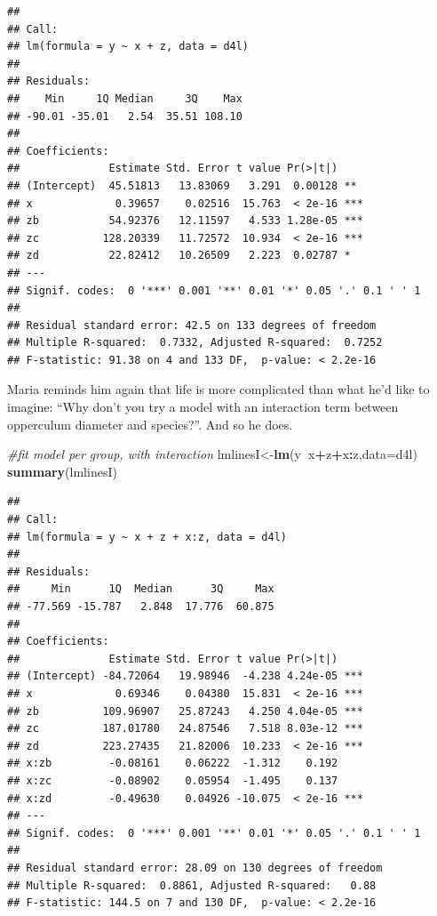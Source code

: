 \documentclass[
]{book}
\newenvironment{Shaded}{\begin{snugshade}}{\end{snugshade}}
\newcommand{\CommentTok}[1]{\textcolor[rgb]{0.56,0.35,0.01}{\textit{#1}}}
\newcommand{\DataTypeTok}[1]{\textcolor[rgb]{0.13,0.29,0.53}{#1}}
\newcommand{\KeywordTok}[1]{\textcolor[rgb]{0.13,0.29,0.53}{\textbf{#1}}}
\newcommand{\NormalTok}[1]{#1}
\newcommand{\OperatorTok}[1]{\textcolor[rgb]{0.81,0.36,0.00}{\textbf{#1}}}
\begin{document}
\begin{verbatim}
## 
## Call:
## lm(formula = y ~ x + z, data = d4l)
## 
## Residuals:
##    Min     1Q Median     3Q    Max 
## -90.01 -35.01   2.54  35.51 108.10 
## 
## Coefficients:
##              Estimate Std. Error t value Pr(>|t|)    
## (Intercept)  45.51813   13.83069   3.291  0.00128 ** 
## x             0.39657    0.02516  15.763  < 2e-16 ***
## zb           54.92376   12.11597   4.533 1.28e-05 ***
## zc          128.20339   11.72572  10.934  < 2e-16 ***
## zd           22.82412   10.26509   2.223  0.02787 *  
## ---
## Signif. codes:  0 '***' 0.001 '**' 0.01 '*' 0.05 '.' 0.1 ' ' 1
## 
## Residual standard error: 42.5 on 133 degrees of freedom
## Multiple R-squared:  0.7332,	Adjusted R-squared:  0.7252 
## F-statistic: 91.38 on 4 and 133 DF,  p-value: < 2.2e-16
\end{verbatim}

Maria reminds him again that life is more complicated than what he'd like to imagine: ``Why don't you try a model with an interaction term between opperculum diameter and species?''. And so he does.

\begin{Shaded}
\begin{Highlighting}[]
\CommentTok{#fit model per group, with interaction}
\NormalTok{lmlinesI<-}\KeywordTok{lm}\NormalTok{(y}\OperatorTok{~}\NormalTok{x}\OperatorTok{+}\NormalTok{z}\OperatorTok{+}\NormalTok{x}\OperatorTok{:}\NormalTok{z,}\DataTypeTok{data=}\NormalTok{d4l)}
\KeywordTok{summary}\NormalTok{(lmlinesI)}
\end{Highlighting}
\end{Shaded}

\begin{verbatim}
## 
## Call:
## lm(formula = y ~ x + z + x:z, data = d4l)
## 
## Residuals:
##     Min      1Q  Median      3Q     Max 
## -77.569 -15.787   2.848  17.776  60.875 
## 
## Coefficients:
##              Estimate Std. Error t value Pr(>|t|)    
## (Intercept) -84.72064   19.98946  -4.238 4.24e-05 ***
## x             0.69346    0.04380  15.831  < 2e-16 ***
## zb          109.96907   25.87243   4.250 4.04e-05 ***
## zc          187.01780   24.87546   7.518 8.03e-12 ***
## zd          223.27435   21.82006  10.233  < 2e-16 ***
## x:zb         -0.08161    0.06222  -1.312    0.192    
## x:zc         -0.08902    0.05954  -1.495    0.137    
## x:zd         -0.49630    0.04926 -10.075  < 2e-16 ***
## ---
## Signif. codes:  0 '***' 0.001 '**' 0.01 '*' 0.05 '.' 0.1 ' ' 1
## 
## Residual standard error: 28.09 on 130 degrees of freedom
## Multiple R-squared:  0.8861,	Adjusted R-squared:   0.88 
## F-statistic: 144.5 on 7 and 130 DF,  p-value: < 2.2e-16
\end{verbatim}
\end{document}
